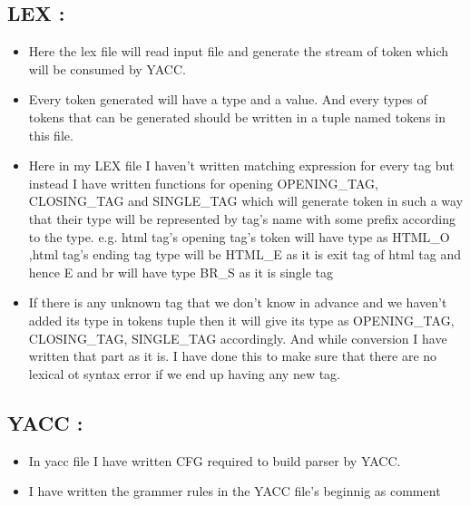 \documentclass{article}
\begin{document}
\subsection{LEX : 
}
\begin{itemize}
\item Here the lex file will read input file and generate the stream of token which will be consumed by YACC.

\item Every token generated will have a type and a value. And every types of tokens that can be generated should be written in a tuple named tokens in this file.

\item Here in my LEX file I haven't written matching expression for every tag but instead I have written functions for opening OPENING\_TAG, CLOSING\_TAG and SINGLE\_TAG
which will generate token in such a way that their type will be represented by tag's name with some prefix according to the type. e.g. html tag's opening tag's token will have type as HTML\_O
,html tag's ending tag type will be HTML\_E as it is exit tag of html tag and hence E and br will have type BR\_S as it is single tag

\item If there is any unknown tag that we don't know in advance and we haven't added its type in tokens tuple then it will give its type as OPENING\_TAG, CLOSING\_TAG, SINGLE\_TAG accordingly. And while conversion I have written that part as it is. I have done this to make sure that there are no lexical ot syntax error if we end up having any new tag.

\end{itemize}
\subsection{YACC : 
}
\begin{itemize}
\item In yacc file I have written CFG required to build parser by YACC.

\item I have written the grammer rules in the YACC file's beginnig as comment

\end{itemize}
\end{document}
